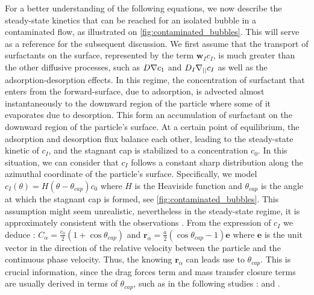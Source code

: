 For a better understanding of the following equations, we now describe the steady-state kinetics that can be reached for an isolated bubble in a contaminated flow, as illustrated on \ref{fig:contaminated_bubbles}.
This will serve as a reference for the subsequent discussion.
We first assume that the transport of surfactants on the surface, represented  by the term  $\textbf{w}_I c_I$, is much greater than the other diffusive processes, such as $D\mathbf{\nabla} c_1$ and $D_I\mathbf{\nabla}_{||} c_I$ as well as the adsorption-desorption effects. 
In this regime, the concentration of surfactant that enters from the forward-surface, due to adsorption, is advected almost instantaneously to the downward region of the particle where some of it evaporates due to desorption. 
This form an accumulation of surfactant on the downward region of the particle's surface.
At a certain point of equilibrium, the adsorption and desorption flux balance each other, leading to the steady-state kinetic of $c_I$, and the stagnant cap is stabilized to a concentration $c_0$. 
In this situation, we can consider that $c_I$ follows a constant sharp distribution along the azimuthal coordinate of the particle's surface.
Specifically, we model $c_I(\theta) = H(\theta - \theta_{cap}) c_0$ where $H$ is the Heaviside function and $\theta_{cap}$ is the angle at which the stagnant cap is formed, see \ref{fig:contaminated_bubbles}.
This assumption might seem unrealistic, nevertheless in the steady-state regime, it is approximately consistent with the observations \citep{kentheswaran2022direct}.
From the expression of $c_I$ we deduce : $C_\alpha = \frac{c_0}{2}(1+\cos\theta_{cap})$ and $\textbf{r}_\alpha = \frac{a}{2} (\cos\theta_{cap} -1)\textbf{e}$ where $\textbf{e}$ is the unit vector in the direction of the relative velocity between the particle and the continuous phase velocity.
Thus, the knowing $\textbf{r}_\alpha$ can leads use to $\theta_{cap}$. 
This is crucial information, since the drag forces term and mass transfer closure terms are usually derived in terms of $\theta_{cap}$, such as in the following studies : \citet{sadhal1983stokes} and \citet{kentheswaran2022direct}. 

